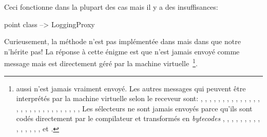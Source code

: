 \documentclass[a4paper,10pt,twoside]{book}
\begin{document}
Ceci fonctionne dans la plupart des cas mais il y a des insuffisances:
\begin{code}{}
point class --> LoggingProxy
\end{code}
Curieusement, la méthode  n'est pas implémentée dans 
 mais dans  que notre  n'hérite pas!
La réponse à cette énigme est que  n'est jamais envoyé comme message mais est directement géré par la machine virtuelle~\footnote{ aussi n'est jamais vraiment envoyé.
Les autres messages qui peuvent être interprétés par la machine virtuelle selon le receveur sont:
\mbox{\ct{+},}
\mbox{\ct{-},}
\mbox{\ct{<},}
\mbox{\ct{>},}
\mbox{\ct{<=},}
\mbox{\ct{>=},}
\mbox{\ct{=},}
\mbox{\ct{\~=},}
\mbox{\ct{*},}
\mbox{\ct{/},}
\mbox{\lct{\textbackslash},}
\mbox{\ct{==},}
\mbox{,}
\mbox{,}
\mbox{\ct{//},}
\mbox{,}
\mbox{,}
\mbox{,}
\mbox{,}
\mbox{,}
\mbox{,}
\mbox{,}
\mbox{,}
\mbox{,}
\mbox{,}
\mbox{,}
\mbox{,}
\mbox{,}
\mbox{,}
Les sélecteurs ne sont jamais envoyés parce qu'ils sont codés directement par le compilateur et transformés en \emph{bytecodes} %
\mbox{,}
\mbox{,}
\mbox{,}
\mbox{,}
\mbox{,}
\mbox{,}
\mbox{,}
\mbox{,}
\mbox{,}
\mbox{}
\mbox{,}
\mbox{,}
\mbox{,}
\mbox{,}
\mbox{,}
\mbox{,}
\mbox{} et
\mbox{}.
}.
\end{document}
